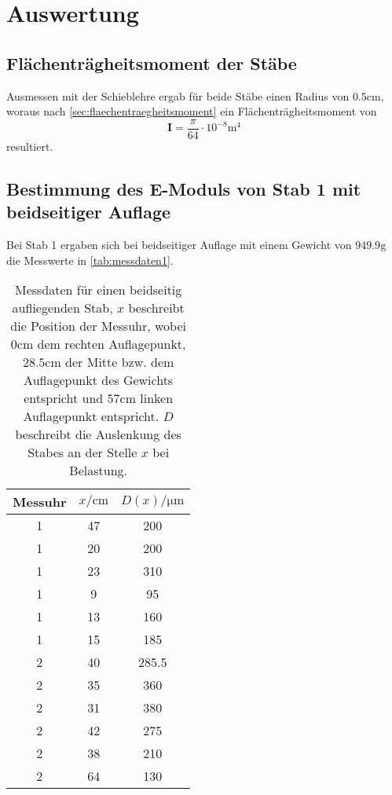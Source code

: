 \section{Auswertung}
\label{sec:Auswertung}
\subsection{Flächenträgheitsmoment der Stäbe}
Ausmessen mit der Schieblehre ergab für beide Stäbe einen Radius von 
$0.5\si{\centi\meter}$, woraus nach \autoref{sec:flaechentraegheitsmoment} ein
Flächenträgheitsmoment von
\begin{equation}
	\mathbf{I} 
	= \frac{\pi}{64} \cdot 10^{-8} \si{\m^4}
	\label{eqn:IWert}
\end{equation}
resultiert.

\subsection{Bestimmung des E-Moduls von Stab 1 mit beidseitiger Auflage}
\label{sec:messung1}
Bei Stab 1 ergaben sich bei beidseitiger Auflage mit einem Gewicht von $949.9 \si{\gram}$ 
die Messwerte in \autoref{tab:messdaten1}.

\begin{table}
	\centering
	\caption{Messdaten für einen beidseitig aufliegenden Stab, $x$ beschreibt
	die Position der Messuhr, wobei $0\si{\centi\meter}$
	dem rechten Auflagepunkt, $28.5\si{\centi\meter}$ der Mitte bzw. dem Auflagepunkt 
	des Gewichts entspricht und $57\si{\centi\meter}$ linken Auflagepunkt entspricht.
	$D$ beschreibt die Auslenkung des Stabes an der Stelle $x$ bei Belastung.}
	\label{tab:messdaten1}
	\begin{tabular}{c c c}
	\toprule
	Messuhr &
	$x / \si{\centi\meter}$ &
	$D(x) / \si{\micro\meter}$
	\\
	\midrule
	1 & 47 & 200 \\
	1 & 20 & 200 \\
	1 & 23 & 310 \\
	1 & 9 & 95 \\
	1 & 13 & 160 \\
	1 & 15 & 185 \\
	2 & 40 & 285.5 \\
	2 & 35 & 360 \\
	2 & 31 & 380 \\
	2 & 42 & 275 \\
	2 & 38 & 210 \\
	2 & 64 & 130 \\
	\bottomrule
\end{tabular}
\end{table}

